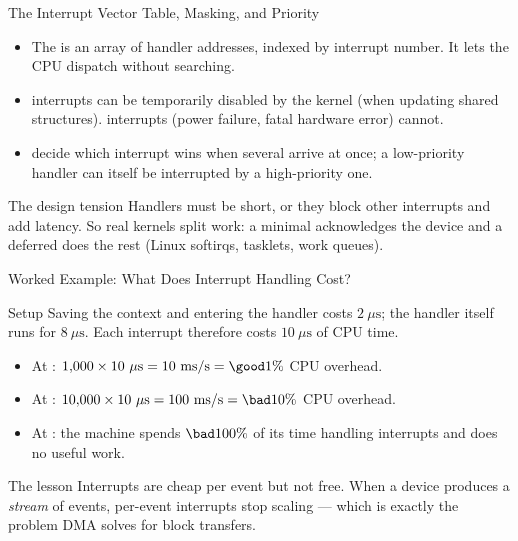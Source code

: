 \documentclass[aspectratio=169]{beamer}
\begin{document}
\begin{frame}{The Interrupt Vector Table, Masking, and Priority}
  \begin{itemize}
    \item The  is an array of handler addresses,
      indexed by interrupt number. It lets the CPU dispatch without searching.
    \item {} interrupts can be temporarily disabled by the kernel
      (when updating shared structures).  interrupts
      (power failure, fatal hardware error) cannot.
    \item {} decide which interrupt wins when several arrive
      at once; a low-priority handler can itself be interrupted by a
      high-priority one.
  \end{itemize}
  \vspace{0.2cm}
  \begin{alertblock}{The design tension}
    Handlers must be short, or they block other interrupts and add latency. So
    real kernels split work: a minimal  acknowledges the device and
    a deferred  does the rest (Linux softirqs, tasklets, work
    queues).
  \end{alertblock}
  \vspace{0.1cm}
\end{frame}

\begin{frame}{Worked Example: What Does Interrupt Handling Cost?}
  \begin{block}{Setup}
    Saving the context and entering the handler costs $2\ \mu\text{s}$; the
    handler itself runs for $8\ \mu\text{s}$. Each interrupt therefore costs
    $10\ \mu\text{s}$ of CPU time.
  \end{block}
  \begin{itemize}
    \item At : $1{,}000 \times 10\ \mu\text{s} =
      10\ \text{ms/s} = \good{1\%}$ CPU overhead.
    \item At : $10{,}000 \times 10\ \mu\text{s} =
      100\ \text{ms/s} = \bad{10\%}$ CPU overhead.
    \item At : the machine spends
      $\bad{100\%}$ of its time handling interrupts and does no useful work.
  \end{itemize}
  \vspace{0.2cm}
  \begin{alertblock}{The lesson}
    Interrupts are cheap per event but not free. When a device produces a
    \emph{stream} of events, per-event interrupts stop scaling --- which is
    exactly the problem DMA solves for block transfers.
  \end{alertblock}
\end{frame}
\end{document}
